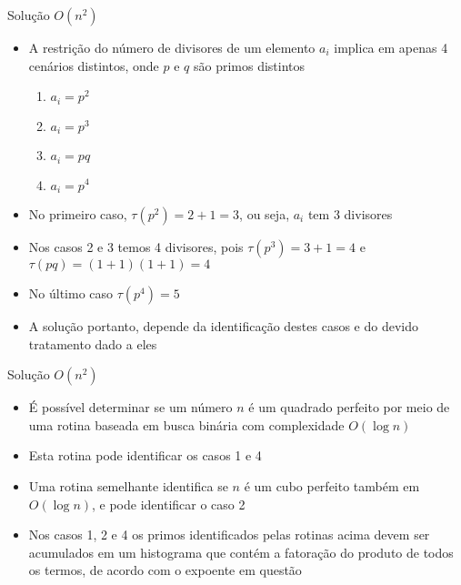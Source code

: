 \begin{frame}[fragile]{Solução $O(n^2)$}

    \begin{itemize}
        \item A restrição do número de divisores de um elemento $a_i$ implica em apenas 4 cenários
            distintos, onde $p$ e $q$ são primos distintos
        \begin{enumerate}
            \item $a_i = p^2$
            \item $a_i = p^3$
            \item $a_i = pq$
            \item $a_i = p^4$
        \end{enumerate}

        \item No primeiro caso, $\tau(p^2) = 2 + 1 = 3$, ou seja, $a_i$ tem 3 divisores

        \item Nos casos 2 e 3 temos 4 divisores, pois $\tau(p^3) = 3 + 1 = 4$ e 
            $\tau(pq) = (1 + 1)(1 + 1) = 4$

        \item No último caso $\tau(p^4) = 5$

        \item A solução portanto, depende da identificação destes casos e do devido tratamento
            dado a eles
    \end{itemize}

\end{frame}

\begin{frame}[fragile]{Solução $O(n^2)$}

    \begin{itemize}
        \item É possível determinar se um número $n$ é um quadrado perfeito por meio de uma
            rotina baseada em busca binária com complexidade $O(\log n)$

        \item Esta rotina pode identificar os casos 1 e 4

        \item Uma rotina semelhante identifica se $n$ é um cubo perfeito também em $O(\log n)$, e
            pode identificar o caso 2

        \item Nos casos 1, 2 e 4 os primos identificados pelas rotinas acima devem ser acumulados
            em um histograma que contém a fatoração do produto de todos os termos, de acordo com
            o expoente em questão
        
    \end{itemize}

\end{frame}

